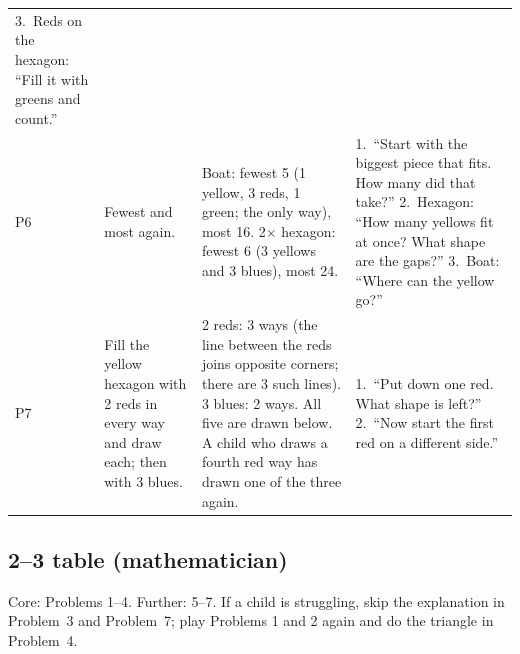 \documentclass[10pt]{article}
\newcommand{\more}{\newline{\footnotesize further}}
\begin{document}
{\begin{xltabular}{\linewidth}{L{0.42in} L{1.45in} Y Y}
3.~Reds on the hexagon: ``Fill it with greens and count.''\\
P6\more & Fewest and most again. &
Boat: fewest 5 (1 yellow, 3 reds, 1 green; the only way), most 16.
2$\times$ hexagon: fewest 6 (3 yellows and 3 blues), most 24. &
1.~``Start with the biggest piece that fits. How many did that take?''
2.~Hexagon: ``How many yellows fit at once? What shape are the gaps?''
3.~Boat: ``Where can the yellow go?''\\
P7\more & Fill the yellow hexagon with 2 reds in every way and draw each; then with 3 blues. &
2 reds: 3 ways (the line between the reds joins opposite corners; there are 3 such lines). 3 blues: 2 ways. All five are drawn below. A child who draws a fourth red way has drawn one of the three again. &
1.~``Put down one red. What shape is left?''
2.~``Now start the first red on a different side.''\\
\bottomrule
\end{xltabular}
}

\newpage
\subsection{2--3 table (mathematician)}

Core: Problems 1--4. Further: 5--7. If a child is struggling, skip the explanation in Problem~3 and Problem~7; play Problems 1 and 2 again and do the triangle in Problem~4.
\end{document}
